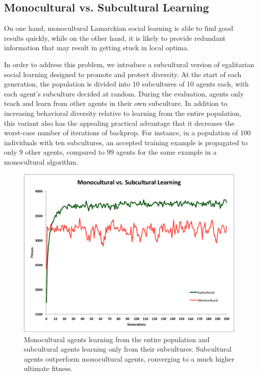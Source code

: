 \documentclass{sig-alternate}
\begin{document}
\subsection{Monocultural vs. Subcultural Learning}
On one hand, monocultural Lamarckian social learning is able to find good results quickly, while on the other hand, it is likely to provide redundant information that may result in getting stuck in local optima.  

In order to address this problem, we introduce a subcultural version of egalitarian social learning designed to promote and protect diversity. At the start of each generation, the population is divided into 10 subcultures of 10 agents each, with each agent's subculture decided at random. During the evaluation, agents only teach and learn from other agents in their own subculture. In addition to increasing behavioral diversity relative to learning from the entire population, this variant also has the appealing practical advantage that it decreases the worst-case number of iterations of backprop. For instance, in a population of 100 individuals with ten subcultures, an accepted training example is propagated to only 9 other agents, compared to 99 agents for the same example in a monocultural algorithm.

\begin{figure}
  \centering
    \includegraphics[scale=.41]{monocultural_vs_subcultural_learning.pdf}
  \caption{Monocultural agents learning from the entire population and subcultural agents learning only from their subcultures.  Subcultural agents outperform monocultural agents, converging to a much higher ultimate fitness.}
  \label{fig:population-social}
\end{figure}
\end{document}

